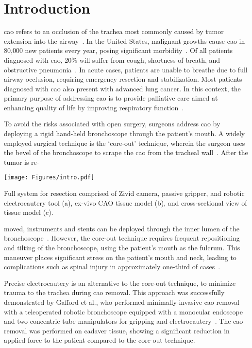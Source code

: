 \section{Introduction}


\Gls{cao} refers to an occlusion of the trachea most commonly caused by tumor extension into the airway~\cite{Chen2011}. In the United States, malignant growths cause \gls{cao} in 80,000 new patients every year, posing significant morbidity~\cite{Chen1998}. Of all patients diagnosed with \gls{cao}, 20\% will suffer from cough, shortness of breath, and obstructive pneumonia~\cite{Ernst2004}. In acute cases, patients are unable to breathe due to full airway occlusion, requiring emergency resection and stabilization. Most patients diagnosed with \gls{cao} also present with advanced lung cancer. In this context, the primary purpose of addressing \gls{cao} is to provide palliative care aimed at enhancing quality of life by improving respiratory function~\cite{Morris2002}.

To avoid the risks associated with open surgery, surgeons address \gls{cao} by deploying a rigid hand-held bronchoscope through the patient’s mouth. A widely employed surgical technique is the `core-out' technique, wherein the surgeon uses the bevel of the bronchoscope to scrape the \gls{cao} from the tracheal wall~\cite{Mathisen1989, Vishwanath2013}. After the tumor is re-

\begin{figurehere}
    \centering
    \texttt{[image: Figures/intro.pdf]}
    \caption{Full system for resection comprised of Zivid camera, passive gripper, and robotic electrocautery tool (a), ex-vivo CAO tissue model (b), and cross-sectional view of tissue model (c).}
    \label{fig:intro}
\end{figurehere}


\noindent  moved, instruments and stents can be deployed through the inner lumen of the bronchoscope~\cite{Ernst2004}. However, the core-out technique requires frequent repositioning and tilting of the bronchoscope, using the patient’s mouth as the fulcrum. This maneuver places significant stress on the patient’s mouth and neck, leading to complications such as spinal injury in approximately one-third of cases~\cite{Vishwanath2013}.



Precise electrocautery is an alternative to the core-out technique, to minimize trauma to the trachea during \gls{cao} removal. This approach was successfully demonstrated by Gafford et al., who performed minimally-invasive \gls{cao} removal with a teleoperated robotic bronchoscope equipped with a monocular endoscope and two concentric tube manipulators for gripping and electrocautery~\cite{Gafford2020}. The \gls{cao} removal was performed on cadaver tissue, showing a significant reduction in applied force to the patient compared to the core-out technique. 



